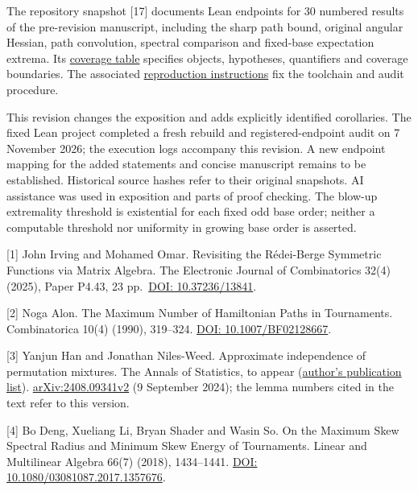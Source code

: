 \documentclass[11pt,a4paper]{article}
\makeatletter
\renewcommand\section{\@startsection{section}{1}{\z@}{-2.8ex plus -1ex minus -.2ex}{1.1ex plus .2ex}{\normalfont\large\bfseries}}
\makeatother
\begin{document}
The repository snapshot {[}17{]} documents Lean endpoints for 30 numbered results of the pre-revision manuscript, including the sharp path bound, original angular Hessian, path convolution, spectral comparison and fixed-base expectation extrema. Its \href{https://github.com/LStar404/tournament-hamiltonian-counts-20261028/blob/c678e9ee24fb304cad755a27c99f511c8640f75e/formal/COVERAGE.zh.md}{coverage table} specifies objects, hypotheses, quantifiers and coverage boundaries. The associated \href{https://github.com/LStar404/tournament-hamiltonian-counts-20261028/blob/c678e9ee24fb304cad755a27c99f511c8640f75e/formal/README.zh.md}{reproduction instructions} fix the toolchain and audit procedure.

This revision changes the exposition and adds explicitly identified corollaries. The fixed Lean project completed a fresh rebuild and registered-endpoint audit on 7 November 2026; the execution logs accompany this revision. A new endpoint mapping for the added statements and concise manuscript remains to be established. Historical source hashes refer to their original snapshots. AI assistance was used in exposition and parts of proof checking. The blow-up extremality threshold is existential for each fixed odd base order; neither a computable threshold nor uniformity in growing base order is asserted.

\section{References}\label{references}

{[}1{]} John Irving and Mohamed Omar. Revisiting the Rédei-Berge Symmetric Functions via Matrix Algebra. The Electronic Journal of Combinatorics 32(4) (2025), Paper P4.43, 23 pp.~\href{https://doi.org/10.37236/13841}{DOI: 10.37236/13841}.

{[}2{]} Noga Alon. The Maximum Number of Hamiltonian Paths in Tournaments. Combinatorica 10(4) (1990), 319--324. \href{https://doi.org/10.1007/BF02128667}{DOI: 10.1007/BF02128667}.

{[}3{]} Yanjun Han and Jonathan Niles-Weed. Approximate independence of permutation mixtures. The Annals of Statistics, to appear (\href{https://yanjunhan2021.github.io/publication.html}{author's publication list}). \href{https://arxiv.org/html/2408.09341v2}{arXiv:2408.09341v2} (9 September 2024); the lemma numbers cited in the text refer to this version.

{[}4{]} Bo Deng, Xueliang Li, Bryan Shader and Wasin So. On the Maximum Skew Spectral Radius and Minimum Skew Energy of Tournaments. Linear and Multilinear Algebra 66(7) (2018), 1434--1441. \href{https://doi.org/10.1080/03081087.2017.1357676}{DOI: 10.1080/03081087.2017.1357676}.
\end{document}
